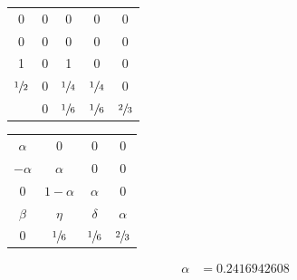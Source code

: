 \documentclass[11pt]{article}
\begin{document}
\begin{table}
    \begin{center}
        \begin{minipage}{0.25\linewidth}
            \begin{center}
                \begin{tabular}{c|cccc}
                    0              & 0 & 0              & 0              & 0              \\
                    0              & 0 & 0              & 0              & 0              \\
                    1              & 0 & 1              & 0              & 0              \\
                    $\sfrac{1}{2}$ & 0 & $\sfrac{1}{4}$ & $\sfrac{1}{4}$ & 0              \\
                    \hline
                                   & 0 & $\sfrac{1}{6}$ & $\sfrac{1}{6}$ & $\sfrac{2}{3}$
                \end{tabular}
            \end{center}
        \end{minipage}
        \hspace{4ex}
        \begin{minipage}{0.25\linewidth}
            \begin{center}
                \begin{tabular}{|cccc}
                    $\alpha$  & 0              & 0              & 0              \\
                    $-\alpha$ & $\alpha$       & 0              & 0              \\
                    0         & $1-\alpha$     & $\alpha$       & 0              \\
                    $\beta$   & $\eta$         & $\delta$       & $\alpha$       \\
                    \hline
                    0         & $\sfrac{1}{6}$ & $\sfrac{1}{6}$ & $\sfrac{2}{3}$
                \end{tabular}
            \end{center}
        \end{minipage}
        \hspace{4ex}
        \begin{minipage}{0.25\linewidth}
            \begin{equation*}
                \begin{aligned}
                    \alpha & = 0.2416942608                         \\

\end{aligned}
\end{equation*}
\end{minipage}
\end{center}
\end{table}
\end{document}
